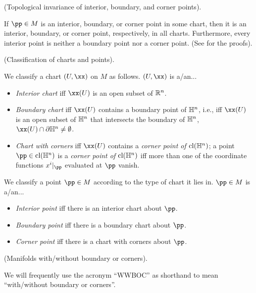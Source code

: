 \begin{theorem}
      (Topological invariance of interior, boundary, and corner points).
        
    If $\pp \in M$ is an interior, boundary, or corner point in some chart, then it is an interior, boundary, or corner point, respectively, in all charts. Furthermore, every interior point is neither a boundary point nor a corner point. (See \cite{book::SM} for the proofs).
\end{theorem}

\begin{defn}
      (Classification of charts and points).
    
    We classify a chart $(U, \xx)$ on $M$ as follows. $(U, \xx)$ is a/an...
    
    \begin{itemize}
        \item \textit{Interior chart} iff $\xx(U)$ is an open subset of $\mathbb{R}^n$.
        \item \textit{Boundary chart} iff $\xx(U)$ contains a boundary point of $\mathbb{H}^n$, i.e., iff $\xx(U)$ is an open subset of $\mathbb{H}^n$ that intersects the boundary of $\mathbb{H}^n$, $\xx(U) \cap \pd \H^n \neq \emptyset$.
        \item \textit{Chart with corners} iff $\xx(U)$ contains a \textit{corner point of $\text{cl}(\mathbb{H}^n)$}; a point $\pp \in \cl(\H^n)$ is a \textit{corner point of $\text{cl}(\mathbb{H}^n)$} iff more than one of the coordinate functions $x^i|_\pp$ evaluated at $\pp$ vanish.
    \end{itemize}
    
    We classify a point $\pp \in M$ according to the type of chart it lies in. $\pp \in M$ is a/an...
    
    \begin{itemize}
        \item \textit{Interior point} iff there is an interior chart about $\pp$.
        \item \textit{Boundary point} iff there is a boundary chart about $\pp$.
        \item \textit{Corner point} iff there is a chart with corners about $\pp$.
    \end{itemize}
\end{defn}

\begin{defn}
    (Manifolds with/without boundary or corners).
    
    We will frequently use the acronym ``WWBOC'' as shorthand to mean ``with/without boundary or corners''.
\end{defn}

